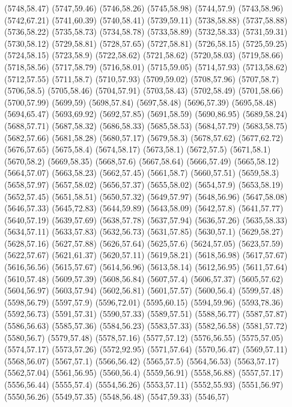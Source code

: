 (5748,58.47)
(5747,59.46)
(5746,58.26)
(5745,58.98)
(5744,57.9)
(5743,58.96)
(5742,67.21)
(5741,60.39)
(5740,58.41)
(5739,59.11)
(5738,58.88)
(5737,58.88)
(5736,58.22)
(5735,58.73)
(5734,58.78)
(5733,58.89)
(5732,58.33)
(5731,59.31)
(5730,58.12)
(5729,58.81)
(5728,57.65)
(5727,58.81)
(5726,58.15)
(5725,59.25)
(5724,58.15)
(5723,58.9)
(5722,58.62)
(5721,58.62)
(5720,58.03)
(5719,58.66)
(5718,58.56)
(5717,58.79)
(5716,58.01)
(5715,59.05)
(5714,57.93)
(5713,58.62)
(5712,57.55)
(5711,58.7)
(5710,57.93)
(5709,59.02)
(5708,57.96)
(5707,58.7)
(5706,58.5)
(5705,58.46)
(5704,57.91)
(5703,58.43)
(5702,58.49)
(5701,58.66)
(5700,57.99)
(5699,59)
(5698,57.84)
(5697,58.48)
(5696,57.39)
(5695,58.48)
(5694,65.47)
(5693,69.92)
(5692,57.85)
(5691,58.59)
(5690,86.95)
(5689,58.24)
(5688,57.71)
(5687,58.32)
(5686,58.33)
(5685,58.53)
(5684,57.79)
(5683,58.75)
(5682,57.66)
(5681,58.28)
(5680,57.17)
(5679,58.3)
(5678,57.62)
(5677,62.72)
(5676,57.65)
(5675,58.4)
(5674,58.17)
(5673,58.1)
(5672,57.5)
(5671,58.1)
(5670,58.2)
(5669,58.35)
(5668,57.6)
(5667,58.64)
(5666,57.49)
(5665,58.12)
(5664,57.07)
(5663,58.23)
(5662,57.45)
(5661,58.7)
(5660,57.51)
(5659,58.3)
(5658,57.97)
(5657,58.02)
(5656,57.37)
(5655,58.02)
(5654,57.9)
(5653,58.19)
(5652,57.45)
(5651,58.51)
(5650,57.32)
(5649,57.97)
(5648,56.96)
(5647,58.08)
(5646,57.33)
(5645,72.83)
(5644,59.89)
(5643,58.09)
(5642,57.8)
(5641,57.77)
(5640,57.19)
(5639,57.69)
(5638,57.78)
(5637,57.94)
(5636,57.26)
(5635,58.33)
(5634,57.11)
(5633,57.83)
(5632,56.73)
(5631,57.85)
(5630,57.1)
(5629,58.27)
(5628,57.16)
(5627,57.88)
(5626,57.64)
(5625,57.6)
(5624,57.05)
(5623,57.59)
(5622,57.67)
(5621,61.37)
(5620,57.11)
(5619,58.21)
(5618,56.98)
(5617,57.67)
(5616,56.56)
(5615,57.67)
(5614,56.96)
(5613,58.14)
(5612,56.95)
(5611,57.64)
(5610,57.48)
(5609,57.39)
(5608,56.84)
(5607,57.4)
(5606,57.37)
(5605,57.62)
(5604,56.97)
(5603,57.94)
(5602,56.81)
(5601,57.57)
(5600,56.4)
(5599,57.48)
(5598,56.79)
(5597,57.9)
(5596,72.01)
(5595,60.15)
(5594,59.96)
(5593,78.36)
(5592,56.73)
(5591,57.31)
(5590,57.33)
(5589,57.51)
(5588,56.77)
(5587,57.87)
(5586,56.63)
(5585,57.36)
(5584,56.23)
(5583,57.33)
(5582,56.58)
(5581,57.72)
(5580,56.7)
(5579,57.48)
(5578,57.16)
(5577,57.12)
(5576,56.55)
(5575,57.05)
(5574,57.17)
(5573,57.26)
(5572,92.95)
(5571,57.64)
(5570,56.47)
(5569,57.11)
(5568,56.07)
(5567,57.1)
(5566,56.42)
(5565,57.5)
(5564,56.53)
(5563,57.17)
(5562,57.04)
(5561,56.95)
(5560,56.4)
(5559,56.91)
(5558,56.88)
(5557,57.17)
(5556,56.44)
(5555,57.4)
(5554,56.26)
(5553,57.11)
(5552,55.93)
(5551,56.97)
(5550,56.26)
(5549,57.35)
(5548,56.48)
(5547,59.33)
(5546,57)

